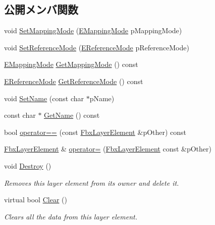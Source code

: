 \subsection*{公開メンバ関数}
\begin{DoxyCompactItemize}
\item 
void \hyperlink{class_fbx_layer_element_af6918a0a87c5df4d257198d3c6a12ee2}{Set\+Mapping\+Mode} (\hyperlink{class_fbx_layer_element_a5a40e95db30ae9f94611dc3f1568af26}{E\+Mapping\+Mode} p\+Mapping\+Mode)
\item 
void \hyperlink{class_fbx_layer_element_a725681d86b87ca356eda6bb681026257}{Set\+Reference\+Mode} (\hyperlink{class_fbx_layer_element_a00f04654580ca9b2f5d292c11abd83fc}{E\+Reference\+Mode} p\+Reference\+Mode)
\item 
\hyperlink{class_fbx_layer_element_a5a40e95db30ae9f94611dc3f1568af26}{E\+Mapping\+Mode} \hyperlink{class_fbx_layer_element_a3b20bf41d0b5abc9661b8b93e033cddb}{Get\+Mapping\+Mode} () const
\item 
\hyperlink{class_fbx_layer_element_a00f04654580ca9b2f5d292c11abd83fc}{E\+Reference\+Mode} \hyperlink{class_fbx_layer_element_ae135c9331612660680a0acc97de02d60}{Get\+Reference\+Mode} () const
\item 
void \hyperlink{class_fbx_layer_element_a6b7d11d4cc2732537377f9483bac4d52}{Set\+Name} (const char $\ast$p\+Name)
\item 
const char $\ast$ \hyperlink{class_fbx_layer_element_af6ca442eaaaac61cec689cf7e39138a6}{Get\+Name} () const
\item 
bool \hyperlink{class_fbx_layer_element_a3ee62705102c228619427b17361073b7}{operator==} (const \hyperlink{class_fbx_layer_element}{Fbx\+Layer\+Element} \&p\+Other) const
\item 
\hyperlink{class_fbx_layer_element}{Fbx\+Layer\+Element} \& \hyperlink{class_fbx_layer_element_a86eb3d2fb38fe2624b4e00369d6a25ea}{operator=} (\hyperlink{class_fbx_layer_element}{Fbx\+Layer\+Element} const \&p\+Other)
\item 
void \hyperlink{class_fbx_layer_element_aa9a90be7d41c6b5e3b7813ea6967b8a4}{Destroy} ()
\begin{DoxyCompactList}\small\item\em Removes this layer element from its owner and delete it. \end{DoxyCompactList}\item 
virtual bool \hyperlink{class_fbx_layer_element_a6ab41d0a26802a359efbbc3b2b12dd3d}{Clear} ()
\begin{DoxyCompactList}\small\item\em Clears all the data from this layer element. \end{DoxyCompactList}\item 

\end{DoxyCompactItemize}
